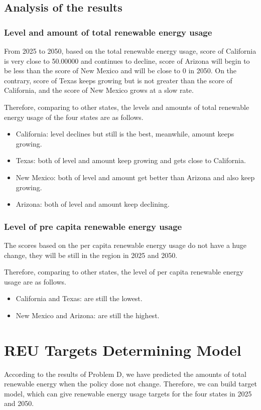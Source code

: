 \documentclass[a4paper,11pt]{article}
\begin{document}
\subsection{Analysis of the results}
\subsubsection{Level and amount of total renewable energy usage}
\par From 2025 to 2050, based on the total renewable energy usage, score of California is very close to 50.00000 and continues to decline, score of Arizona will begin to be less than the score of New Mexico and will be close to 0 in 2050. On the contrary, score of Texas keeps growing but is not greater than the score of California, and the score of New Mexico grows at a slow rate.
\par Therefore, comparing to other states, the levels and amounts of total renewable energy usage of the four states are as follows.
\begin{itemize}
    \item California: level declines but still is the best, meanwhile, amount keeps growing.
    \item Texas: both of level and amount keep growing and gets close to California.
    \item New Mexico: both of level and amount get better than Arizona and also keep growing.
    \item Arizona: both of level and amount keep declining.
\end{itemize}
\subsubsection{Level of pre capita renewable energy usage}
\par The scores based on the per capita renewable energy usage do not have a huge change, they will be still in the region in 2025 and 2050.
\par Therefore, comparing to other states, the level of per capita renewable energy usage are as follows.
\begin{itemize}
    \item California and Texas: are still the lowest.
    \item New Mexico and Arizona: are still the highest.
\end{itemize}



\section{REU Targets Determining Model}
\par According to the results of Problem D, we have predicted the amounts of total renewable energy when the policy dose not change. Therefore, we can build target model, which can give renewable energy usage targets for the four states in 2025 and 2050.
\end{document}
